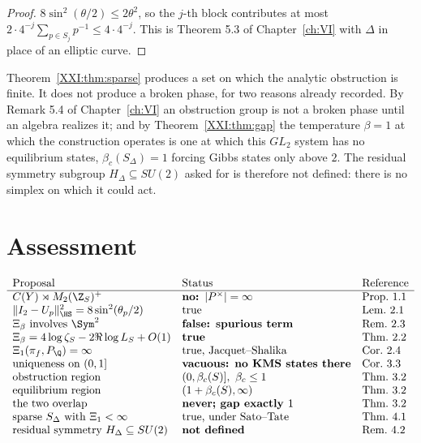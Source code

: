 \begin{proof}
$8\sin^2(\theta/2)\le2\theta^2$, so the $j$-th block contributes at most
$2\cdot4^{-j}\sum_{p\in S_j}p^{-1}\le4\cdot4^{-j}$. This is Theorem 5.3 of Chapter~\ref{ch:VI} with
$\Delta$ in place of an elliptic curve.
\end{proof}

\begin{remark}\label{XXI:rem:notbreaking}
Theorem~\ref{XXI:thm:sparse} produces a set on which the analytic obstruction is finite. It does
not produce a broken phase, for two reasons already recorded. By
Remark 5.4 of Chapter~\ref{ch:VI} an obstruction group is not a broken phase until an algebra realizes
it; and by Theorem~\ref{XXI:thm:gap} the temperature $\beta=1$ at which the construction operates
is one at which this $GL_2$ system has no equilibrium states, $\beta_c(S_\Delta)=1$ forcing
Gibbs states only above $2$. The residual symmetry subgroup $H_\Delta\subseteq SU(2)$ asked
for is therefore not defined: there is no simplex on which it could act.
\end{remark}

\section{Assessment}

\[
\begin{array}{lll}
\text{Proposal} & \text{Status} & \text{Reference}\\\hline
C(Y)\rtimes M_2(\Z_S)^+ & \textbf{no: }|P^\times|=\infty & \text{Prop.~1.1}\\
\|I_2-U_p\|^2_\HS=8\sin^2(\theta_p/2) & \text{true} & \text{Lem.~2.1}\\
\Xi_\beta\ \text{involves}\ \Sym^2 & \textbf{false: spurious term} & \text{Rem.~2.3}\\
\Xi_\beta=4\log\zeta_S-2\Re\log L_S+O(1) & \textbf{true} & \text{Thm.~2.2}\\
\Xi_1(\pi_f,P_\Q)=\infty & \text{true, Jacquet--Shalika} & \text{Cor.~2.4}\\
\text{uniqueness on }(0,1] & \textbf{vacuous: no KMS states there} & \text{Cor.~3.3}\\
\text{obstruction region} & (0,\beta_c(S)],\ \beta_c\le1 & \text{Thm.~3.2}\\
\text{equilibrium region} & (1+\beta_c(S),\infty) & \text{Thm.~3.2}\\
\text{the two overlap} & \textbf{never; gap exactly }1 & \text{Thm.~3.2}\\
\text{sparse }S_\Delta\ \text{with}\ \Xi_1<\infty & \text{true, under Sato--Tate} & \text{Thm.~4.1}\\
\text{residual symmetry}\ H_\Delta\subseteq SU(2) & \textbf{not defined} & \text{Rem.~4.2}
\end{array}
\]

